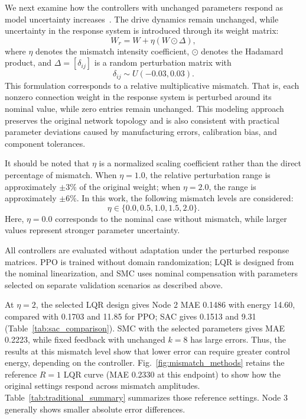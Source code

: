 \documentclass[a4paper,fleqn]{cas-dc}
\theoremstyle{plain}
\theoremstyle{definition}
\begin{document}



We next examine how the controllers with unchanged parameters respond as model uncertainty increases~\cite{zhang2011weak}. The drive dynamics remain unchanged, while uncertainty in the response system is introduced through its weight matrix:
\begin{equation}
	W_r = W + \eta (W\odot \Delta),
	\label{eq:mismatch_matrix}
\end{equation}
where $\eta$ denotes the mismatch intensity coefficient, $\odot$ denotes the Hadamard product, and $\Delta=[\delta_{ij}]$ is a random perturbation matrix with
\begin{equation}
	\delta_{ij}\sim U(-0.03,0.03).
	\label{eq:mismatch_delta}
\end{equation}
This formulation corresponds to a relative multiplicative mismatch. That is, each nonzero connection weight in the response system is perturbed around its nominal value, while zero entries remain unchanged. This modeling approach preserves the original network topology and is also consistent with practical parameter deviations caused by manufacturing errors, calibration bias, and component tolerances.

It should be noted that $\eta$ is a normalized scaling coefficient rather than the direct percentage of mismatch. When $\eta=1.0$, the relative perturbation range is approximately $\pm 3\%$ of the original weight; when $\eta=2.0$, the range is approximately $\pm 6\%$. In this work, the following mismatch levels are considered:
\begin{equation}
	\eta\in\{0.0,0.5,1.0,1.5,2.0\}.
	\label{eq:mismatch_levels}
\end{equation}
Here, $\eta=0.0$ corresponds to the nominal case without mismatch, while larger values represent stronger parameter uncertainty.

All controllers are evaluated without adaptation under the perturbed response matrices. PPO is trained without domain randomization; LQR is designed from the nominal linearization, and SMC uses nominal compensation with parameters selected on separate validation scenarios as described above.

At $\eta=2$, the selected LQR design gives Node 2 MAE 0.1486 with energy 14.60, compared with 0.1703 and 11.85 for PPO; SAC gives 0.1513 and 9.31 (Table~\ref{tab:sac_comparison}). SMC with the selected parameters gives MAE 0.2223, while fixed feedback with unchanged $k=8$ has large errors. Thus, the results at this mismatch level show that lower error can require greater control energy, depending on the controller. Fig.~\ref{fig:mismatch_methods} retains the reference $R=1$ LQR curve (MAE 0.2330 at this endpoint) to show how the original settings respond across mismatch amplitudes. Table~\ref{tab:traditional_summary} summarizes those reference settings. Node 3 generally shows smaller absolute error differences.
\end{document}
